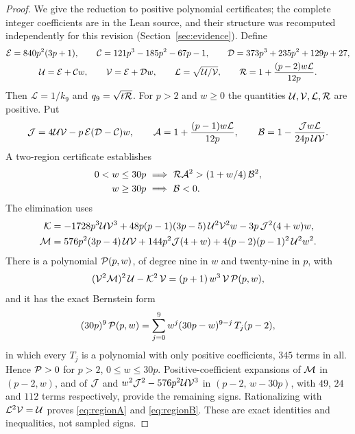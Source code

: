 \begin{proof}
We give the reduction to positive polynomial certificates; the complete integer coefficients are in the
Lean source, and their structure was recomputed independently for this revision
(Section~\ref{sec:evidence}). Define
\begin{gather*}
\mathcal{E}=840p^{2}(3p+1),\qquad \mathcal{C}=121p^{3}-185p^{2}-67p-1,\qquad \mathcal{D}=373p^{3}+235p^{2}+129p+27,\\
\mathcal{U}=\mathcal{E}+\mathcal{C} w,\qquad \mathcal{V}=\mathcal{E}+\mathcal{D} w,\qquad \mathcal{L}=\sqrt{\mathcal{U}/\mathcal{V}},\qquad \mathcal{R}=1+\frac{(p-2)w\mathcal{L}}{12p}.
\end{gather*}
Then $\mathcal{L}=1/k_9$ and $q_9=\sqrt{t\mathcal{R}}$. For $p>2$ and $w\ge0$ the quantities
$\mathcal{U},\mathcal{V},\mathcal{L},\mathcal{R}$ are positive. Put
\[ \mathcal{J}=4\mathcal{U}\mathcal{V}-p\,\mathcal{E}(\mathcal{D}-\mathcal{C})w,\qquad \mathcal{A}=1+\frac{(p-1)w\mathcal{L}}{12p},\qquad
\mathcal{B}=1-\frac{\mathcal{J} w\mathcal{L}}{24p\,\mathcal{U}\mathcal{V}}. \]
A two-region certificate establishes
\begin{align}
0<w\le30p&\ \Longrightarrow\ \cR\cA^{2}>(1+w/4)\,\cB^{2},\label{eq:regionA}\\
w\ge30p&\ \Longrightarrow\ \cB<0.\label{eq:regionB}
\end{align}
The elimination uses
\begin{align*}
\mathcal{K}&=-1728p^{3}\mathcal{U}\mathcal{V}^{3}+48p(p-1)(3p-5)\,\mathcal{U}^{2}\mathcal{V}^{2}w-3p\,\mathcal{J}^{2}(4+w)w,\\
\mathcal{M}&=576p^{2}(3p-4)\,\mathcal{U}\mathcal{V}+144p^{2}\mathcal{J}(4+w)+4(p-2)(p-1)^{2}\,\mathcal{U}^{2}w^{2}.
\end{align*}
There is a polynomial $\mathcal{P}(p,w)$, of degree nine in $w$ and twenty-nine in $p$, with
\[ (\mathcal{V}^{2}\mathcal{M})^{2}\,\mathcal{U}-\mathcal{K}^{2}\,\mathcal{V}=(p+1)\,w^{3}\,\mathcal{V}\,\mathcal{P}(p,w), \]
and it has the exact Bernstein form
\begin{equation}\label{eq:bernstein}
(30p)^{9}\,\mathcal{P}(p,w)=\sum_{j=0}^{9}w^{j}(30p-w)^{9-j}\,T_j(p-2),
\end{equation}
in which every $T_j$ is a polynomial with only positive coefficients, $345$ terms in all. Hence
$\mathcal{P}>0$ for $p>2$, $0\le w\le30p$. Positive-coefficient expansions of $\mathcal{M}$ in $(p-2,w)$, and of $\mathcal{J}$
and $w^{2}\mathcal{J}^{2}-576p^{2}\mathcal{U}\mathcal{V}^{3}$ in $(p-2,\,w-30p)$, with $49$, $24$ and $112$ terms respectively,
provide the remaining signs. Rationalizing with $\mathcal{L}^{2}\mathcal{V}=\mathcal{U}$ proves \eqref{eq:regionA} and
\eqref{eq:regionB}. These are exact identities and inequalities, not sampled signs.


\end{proof}
